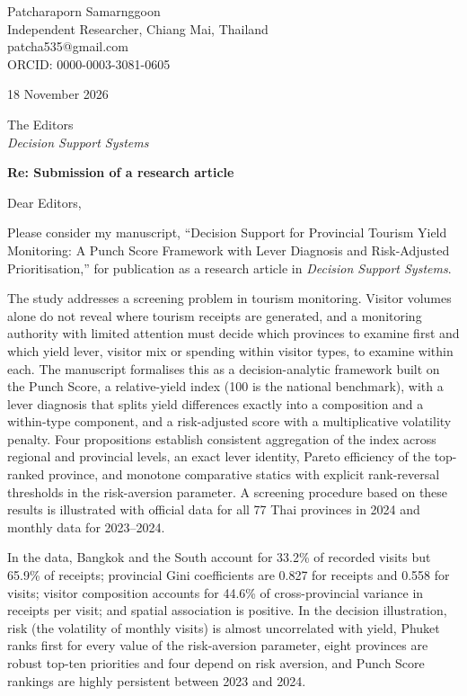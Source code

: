 \documentclass[11pt,a4paper]{article}
\begin{document}
Patcharaporn Samarnggoon\\Independent Researcher, Chiang Mai, Thailand\\patcha535@gmail.com\\ORCID: 0000-0003-3081-0605

18 November 2026

The Editors\\\emph{Decision Support Systems}

\textbf{Re: Submission of a research article}

Dear Editors,

Please consider my manuscript, ``Decision Support for Provincial Tourism Yield Monitoring: A Punch Score Framework with Lever Diagnosis and Risk-Adjusted Prioritisation,'' for publication as a research article in \emph{Decision Support Systems}.

The study addresses a screening problem in tourism monitoring. Visitor volumes alone do not reveal where tourism receipts are generated, and a monitoring authority with limited attention must decide which provinces to examine first and which yield lever, visitor mix or spending within visitor types, to examine within each. The manuscript formalises this as a decision-analytic framework built on the Punch Score, a relative-yield index (100 is the national benchmark), with a lever diagnosis that splits yield differences exactly into a composition and a within-type component, and a risk-adjusted score with a multiplicative volatility penalty. Four propositions establish consistent aggregation of the index across regional and provincial levels, an exact lever identity, Pareto efficiency of the top-ranked province, and monotone comparative statics with explicit rank-reversal thresholds in the risk-aversion parameter. A screening procedure based on these results is illustrated with official data for all 77 Thai provinces in 2024 and monthly data for 2023--2024.

In the data, Bangkok and the South account for 33.2\% of recorded visits but 65.9\% of receipts; provincial Gini coefficients are 0.827 for receipts and 0.558 for visits; visitor composition accounts for 44.6\% of cross-provincial variance in receipts per visit; and spatial association is positive. In the decision illustration, risk (the volatility of monthly visits) is almost uncorrelated with yield, Phuket ranks first for every value of the risk-aversion parameter, eight provinces are robust top-ten priorities and four depend on risk aversion, and Punch Score rankings are highly persistent between 2023 and 2024.
\end{document}
